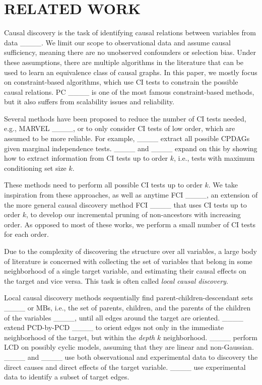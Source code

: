 \section{RELATED WORK}
\label{sec:related_work}

Causal discovery is the task of identifying causal relations between variables from data ____.
We limit our scope to observational data and assume causal sufficiency, meaning there are no unobserved confounders or selection bias.
Under these assumptions, there are multiple algorithms in the literature that can be used to learn an equivalence class of causal graphs. In this paper, we mostly focus on constraint-based algorithms, which use \ac{CI} tests to constrain the possible causal relations. PC ____ is one of the most famous constraint-based methods, but it also suffers from scalability issues and reliability. 

Several methods have been proposed to reduce the number of CI tests needed, e.g., MARVEL ____, or to only consider \ac{CI} tests of low order, which are assumed to be more reliable. For example, ____ extract all possible \acp{CPDAG} given marginal independence tests.
____ and ____ expand on this by showing how to extract information from \ac{CI} tests up to order $k$, i.e., tests with maximum conditioning set size $k$.

These methods need to perform all possible \ac{CI} tests up to order $k$. We take inspiration from these approaches, as well as anytime FCI ____, an extension of the more general causal discovery method FCI ____ that uses CI tests up to order $k$, to develop our incremental pruning of non-ancestors with increasing order.
As opposed to most of these works, we perform a small number of CI tests for each order.

Due to the complexity of discovering the structure over all variables, a large body of literature is concerned with collecting the set of variables that belong in some neighborhood of a single target variable, and estimating their causal effects on the target and vice versa. This task is often called  \emph{local causal discovery}.

Local causal discovery methods sequentially find parent-children-descendant sets ____ or \acp{MB}, i.e., the set of parents, children, and the parents of the children of the variables ____,   
until all edges around the target are oriented.
____ extend PCD-by-PCD ____  to orient edges not only in the immediate neighborhood of the target, but within the \textit{depth $k$} neighborhood.
____ perform \acl{LCD} on possibly cyclic models, assuming that they are linear and non-Gaussian.
____ and ____ use both observational and experimental data to discovery the direct causes and direct effects of the target variable.
____ use experimental data to identify a subset of  target edges.


